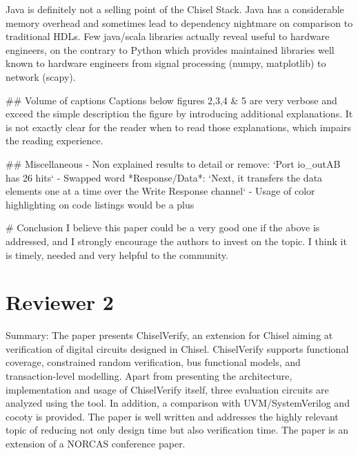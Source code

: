 \documentclass{article}
\begin{document}
Java is definitely not a selling point of the Chisel Stack.
Java has a considerable memory overhead and sometimes lead to dependency nightmare on comparison to traditional HDLs.
Few java/scala libraries actually reveal useful to hardware engineers, on the contrary to Python which provides maintained libraries well known to hardware engineers from signal processing (numpy, matplotlib) to network (scapy).

\#\# Volume of captions
Captions below figures 2,3,4 \& 5 are very verbose and exceed the simple description the figure by introducing additional explanations.
It is not exactly clear for the reader when to read those explanations, which impairs the reading experience.  

\#\# Miscellaneous
- Non explained results to detail or remove: `Port io\_outAB has 26 hits`
- Swapped word *Response/Data*: `Next, it transfers the data elements one at a time over the Write Response channel`
- Usage of color highlighting on code listings would be a plus  

\# Conclusion
I believe this paper could be a very good one if the above is addressed, and I strongly encourage the authors to invest on the topic. 
I think it is timely, needed and very helpful to the community.


\section*{Reviewer 2}

Summary:
The paper presents ChiselVerify, an extension for Chisel aiming at verification of digital circuits designed in Chisel. ChiselVerify supports functional coverage, constrained random verification, bus functional models, and transaction-level modelling. Apart from presenting the architecture, implementation and usage of ChiselVerify itself, three evaluation circuits are analyzed using the tool. In addition, a comparison with UVM/SystemVerilog and cocoty is provided. The paper is well written and addresses the highly relevant topic of reducing not only design time but also verification time. The paper is an extension of a NORCAS conference paper.
\end{document}
